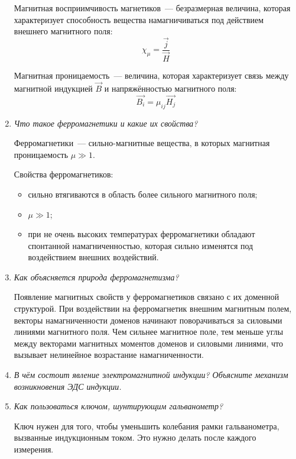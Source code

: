\documentclass[paper=a4,pagesize,draft,10pt]{scrartcl}
\begin{document}
\begin{enumerate}
Магнитная восприимчивость магнетиков~--- безразмерная величина, которая характеризует способность вещества намагничиваться под действием внешнего магнитного поля:
$$\chi_\mu=\frac{\vec{j}}{\vec{H}}$$

Магнитная проницаемость~--- величина, которая характеризует связь между магнитной индукцией $\vec{B}$ и напряжённостью магнитного поля:
$$\vec{B_i}=\mu_{ij}\vec{H_j}$$
\item \textit{Что такое ферромагнетики и какие их свойства?}

Ферромагнетики~--- сильно-магнитные вещества, в которых магнитная проницаемость $\mu\gg1$.

Свойства ферромагнетиков:
\begin{itemize}
\item сильно втягиваются в область более сильного магнитного поля;
\item $\mu\gg1$;
\item при не очень высоких температурах ферромагнетики обладают спонтанной намагниченностью, которая сильно изменятся под воздействием внешних воздействий.
\end{itemize}
\item \textit{Как объясняется природа ферромагнетизма?}

Появление магнитных свойств у ферромагнетиков связано с их доменной структурой.
При воздействии на ферромагнетик внешним магнитным полем, векторы намагниченности доменов начинают поворачиваться за силовыми линиями магнитного поля.
Чем сильнее магнитное поле, тем меньше углы между векторами магнитных моментов доменов и силовыми линиями, что вызывает нелинейное возрастание намагниченности.
\item \textit{В чём состоит явление электромагнитной индукции? Объясните механизм возникновения ЭДС индукции.}
\item \textit{Как пользоваться ключом, шунтирующим гальванометр?}

Ключ нужен для того, чтобы уменьшить колебания рамки гальванометра, вызванные индукционным  током.
Это нужно делать после каждого измерения.
\end{enumerate}
\end{document}
